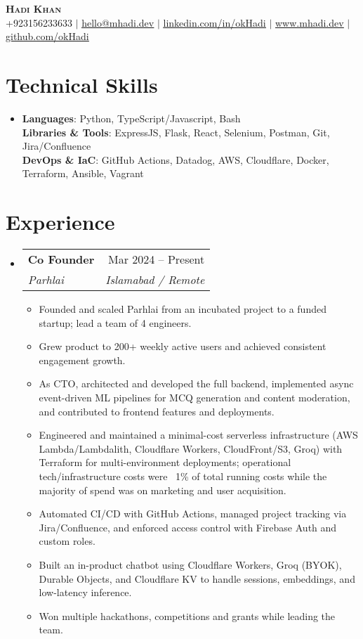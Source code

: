 \documentclass[letterpaper,11pt]{article}
\makeatletter
\newcommand{\resumeItem}[1]{
  \item\small{
    {#1 \vspace{-2pt}}
  }
}
\newcommand{\resumeSubheading}[4]{
  \vspace{-2pt}\item
    \begin{tabular*}{0.97\textwidth}[t]{l@{\extracolsep{\fill}}r}
      \textbf{#1} & #2 \\
      \textit{\small#3} & \textit{\small #4} \\
    \end{tabular*}\vspace{-7pt}
}
\newcommand{\resumeSubHeadingListStart}{\begin{itemize}[leftmargin=0.15in, label={}]}
\newcommand{\resumeSubHeadingListEnd}{\end{itemize}}
\newcommand{\resumeItemListStart}{\begin{itemize}}
\newcommand{\resumeItemListEnd}{\end{itemize}\vspace{-5pt}}
\makeatother
\begin{document}
\begin{center}
    \textbf{\Huge \scshape Hadi Khan} \\ \vspace{1pt}
  \small +923156233633 $|$ \href{mailto:hello@mhadi.dev}{\underline{hello@mhadi.dev}} $|$
  \href{https://www.linkedin.com/in/okhadi/}{\underline{linkedin.com/in/okHadi}} $|$
  \href{https://www.mhadi.dev}{\underline{www.mhadi.dev}} $|$ \href{https://github.com/okHadi}{\underline{github.com/okHadi}}
\end{center}

\section{Technical Skills}
  \begin{itemize}[leftmargin=0.15in, label={}]
    \item \small{
      \textbf{Languages}{: Python, TypeScript/Javascript, Bash} \\
      \textbf{Libraries \& Tools}{: ExpressJS, Flask, React, Selenium, Postman, Git, Jira/Confluence } \\
      \textbf{DevOps \& IaC}{: GitHub Actions, Datadog, AWS, Cloudflare, Docker, Terraform, Ansible, Vagrant} \\
      }
  \end{itemize}

\section{Experience}

  \resumeSubHeadingListStart

    \resumeSubheading
      {Co Founder}{Mar 2024 -- Present}
      {Parhlai}{Islamabad / Remote}
      \resumeItemListStart
        \resumeItem{Founded and scaled Parhlai from an incubated project to a funded startup; lead a team of 4 engineers.}
        \resumeItem{Grew product to 200+ weekly active users and achieved consistent engagement growth.}
    \resumeItem{As CTO, architected and developed the full backend, implemented async event-driven ML pipelines for MCQ generation and content moderation, and contributed to frontend features and deployments.}
    \resumeItem{Engineered and maintained a minimal-cost serverless infrastructure (AWS Lambda/Lambdalith, Cloudflare Workers, CloudFront/S3, Groq) with Terraform for multi-environment deployments; operational tech/infrastructure costs were ~1\% of total running costs while the majority of spend was on marketing and user acquisition.}
    \resumeItem{Automated CI/CD with GitHub Actions, managed project tracking via Jira/Confluence, and enforced access control with Firebase Auth and custom roles.}
    \resumeItem{Built an in-product chatbot using Cloudflare Workers, Groq (BYOK), Durable Objects, and Cloudflare KV to handle sessions, embeddings, and low-latency inference.}
    \resumeItem{Won multiple hackathons, competitions and grants while leading the team.}
      \resumeItemListEnd
  \resumeSubHeadingListEnd
\end{document}

